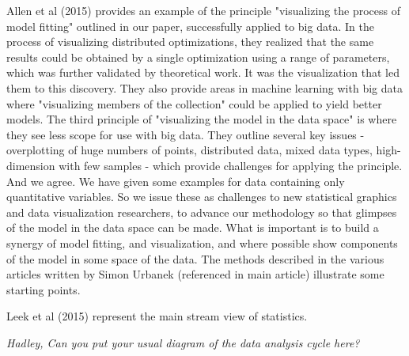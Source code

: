 \documentclass[preprint]{imsart}
\begin{document}
Allen et al (2015)  provides an example of the principle "visualizing the process of model fitting" outlined in our paper, successfully applied to big data. In the process of visualizing distributed optimizations, they realized that the same results could be obtained by a single optimization using a range of parameters, which was further validated by theoretical work. It was the visualization that led them to this discovery. They also provide areas in machine learning with big data where "visualizing members of the collection" could be applied to yield better models. The third principle of "visualizing the model in the data space" is where they see less scope for use with big data. They outline several key issues - overplotting of huge numbers of points, distributed data, mixed data types, high-dimension with few samples - which provide challenges for applying the principle. And we agree. We have given some examples for data containing only quantitative variables. So we issue these as challenges to new statistical graphics and data visualization researchers, to advance our methodology so that glimpses of the model in the data space can be made. What is important is to build a synergy of model fitting, and visualization, and where possible show components of the model in some space of the data. The methods described in the various articles written by Simon Urbanek (referenced in main article)  illustrate some starting points. 

Leek et al (2015) represent the main stream view of statistics. 

\centerline{\em Hadley, Can you put your usual diagram of the data analysis cycle here?}


\end{document}
